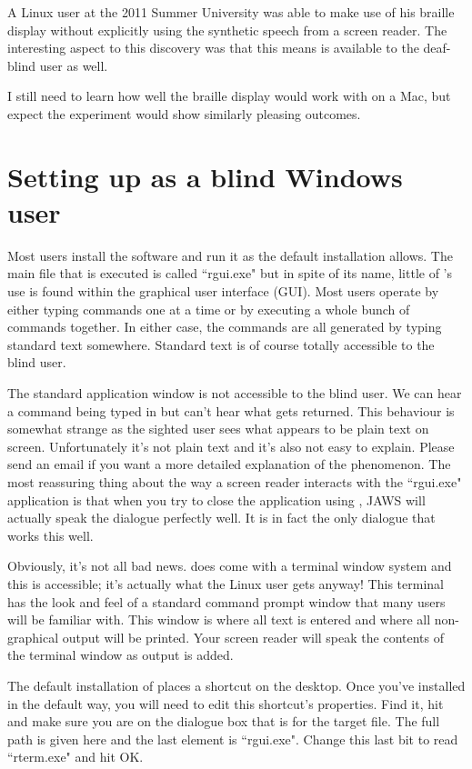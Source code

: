 A Linux user at the 2011 Summer University was able to make use of his braille display without explicitly using the synthetic speech from a screen reader. The interesting aspect to this discovery was that this means \R{} is available to the deaf-blind user as well.

I still need to learn how well the braille display would work with \R{} on a Mac, but expect the experiment would show similarly pleasing outcomes.

\section{Setting up \R{} as a blind Windows user}

Most \R{} users install the software and run it as the default installation allows. The main file that is executed is called ``rgui.exe" but in spite of its name, little of \R{}'s use is found within the graphical user interface (GUI). Most \R{} users operate by either typing commands one at a time or by executing a whole bunch of commands together. In either case, the commands are all generated by typing standard text somewhere. Standard text is of course totally accessible to the blind user.

The standard \R{} application window is not accessible to the blind user. We can hear a command being typed in but can't hear what gets returned. This behaviour is somewhat strange as the sighted user sees what appears to be plain text on screen. Unfortunately it's not plain text and it's also not easy to explain. Please send an email if you want a more detailed explanation of the phenomenon. The most reassuring thing about the way a screen reader interacts with the ``rgui.exe" application is that when you try to close the application using , JAWS will actually speak the dialogue perfectly well. It is in fact the only dialogue that works this well.

Obviously, it's not all bad news. \R{} does come with a terminal window system and this is accessible; it's actually what the Linux user gets anyway! This terminal has the look and feel of a standard command prompt window that many users will be familiar with. This window is where all text is entered and where all non-graphical output will be printed. Your screen reader will speak the contents of the terminal window as output is added.

The default installation of \R{} places a shortcut on the desktop. Once you've installed \R{} in the default way, you will need to edit this shortcut's properties. Find it, hit  and make sure you are on the dialogue box that is for the target file. The full path is given here and the last element is ``rgui.exe". Change this last bit to read ``rterm.exe" and hit OK.

